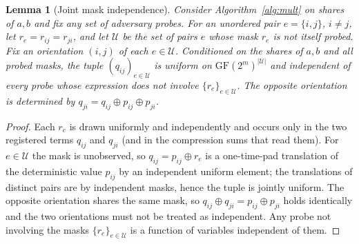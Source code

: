 \documentclass[lettersize,journal]{IEEEtran}
\newtheorem{lemma}{Lemma}
\newcommand{\GF}{\mathrm{GF}}
\begin{document}
\begin{lemma}[Joint mask independence]
\label{lem:jointmask}
Consider Algorithm~\ref{alg:mult} on shares of $a,b$ and fix any set of
adversary probes. For an unordered pair $e=\{i,j\}$, $i\neq j$, let
$r_e=r_{ij}=r_{ji}$, and let $\mathcal{U}$ be the set of pairs $e$ whose
mask $r_e$ is not itself probed. Fix an orientation $(i,j)$ of each
$e\in\mathcal{U}$. Conditioned on the shares of $a,b$ and all probed
masks, the tuple $(q_{ij})_{e\in\mathcal{U}}$ is uniform on
$\GF(2^m)^{|\mathcal{U}|}$ and independent of every probe whose
expression does not involve $\{r_e\}_{e\in\mathcal{U}}$. The opposite
orientation is determined by $q_{ji}=q_{ij}\oplus p_{ij}\oplus p_{ji}$.
\end{lemma}
\begin{proof}
Each $r_e$ is drawn uniformly and independently and occurs only in the two
registered terms $q_{ij}$ and $q_{ji}$ (and in the compression sums that read
them). For $e\in\mathcal{U}$ the mask is unobserved, so $q_{ij}=p_{ij}\oplus
r_e$ is a one-time-pad translation of the deterministic value $p_{ij}$ by an
independent uniform element; the translations of distinct pairs are by
independent masks, hence the tuple is jointly uniform. The opposite
orientation shares the same mask, so $q_{ij}\oplus q_{ji}=p_{ij}\oplus
p_{ji}$ holds identically and the two orientations must not be treated as
independent. Any probe not involving the masks $\{r_e\}_{e\in\mathcal{U}}$ is a
function of variables independent of them.
\end{proof}
\end{document}
